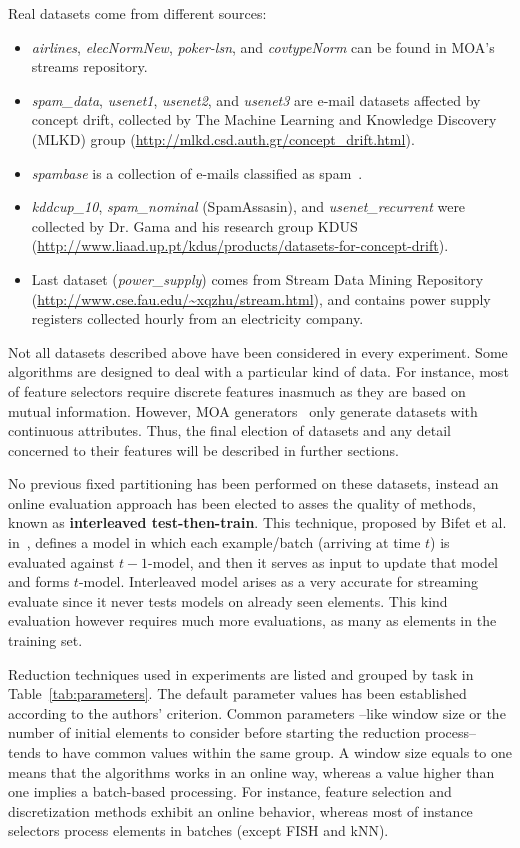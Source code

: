 \documentclass[preprint,12pt]{elsarticle}
\begin{document}
Real datasets come from different sources:

\begin{itemize}
	\item \textit{airlines}, \textit{elecNormNew}, \textit{poker-lsn}, and \textit{covtypeNorm} can be found in MOA's streams repository.
	\item \textit{spam\_data}, \textit{usenet1}, \textit{usenet2}, and \textit{usenet3} are e-mail datasets affected by concept drift, collected by The Machine Learning and Knowledge Discovery (MLKD) group (\url{http://mlkd.csd.auth.gr/concept_drift.html}).
	\item \textit{spambase} is a collection of e-mails classified as spam~\cite{bache13}. 
	\item \textit{kddcup\_10}, \textit{spam\_nominal} (SpamAssasin), and \textit{usenet\_recurrent} were collected by Dr. Gama and his research group KDUS (\url{http://www.liaad.up.pt/kdus/products/datasets-for-concept-drift}). 
	\item Last dataset (\textit{power\_supply}) comes from Stream Data Mining Repository (\url{http://www.cse.fau.edu/~xqzhu/stream.html}), and contains power supply registers collected hourly from an electricity company.
\end{itemize}
 
Not all datasets described above have been considered in every experiment. Some algorithms are designed to deal with a particular kind of data. For instance, most of feature selectors require discrete features inasmuch as they are based on mutual information. However, MOA generators~\cite{bifet10} only generate datasets with continuous attributes. Thus, the final election of datasets and any detail concerned to their features will be described in further sections.

No previous fixed partitioning has been performed on these datasets, instead an online evaluation approach has been elected to asses the quality of methods, known as \textbf{interleaved test-then-train}. This technique, proposed by Bifet et al. in~\cite{bifet09}, defines a model in which each example/batch (arriving at time $t$) is evaluated against $t-1$-model, and then it serves as input to update that model and forms $t$-model. Interleaved model arises as a very accurate for streaming evaluate since it never tests models on already seen elements. This kind evaluation however requires much more evaluations, as many as elements in the training set.

Reduction techniques used in experiments are listed and grouped by task in Table~\ref{tab:parameters}. The default parameter values has been established according to the authors' criterion. Common parameters --like window size or the number of initial elements to consider before starting the reduction process-- tends to have common values within the same group. A window size equals to one means that the algorithms works in an online way, whereas a value higher than one implies a batch-based processing. For instance, feature selection and discretization methods exhibit an online behavior, whereas most of instance selectors process elements in batches (except FISH and kNN).
\end{document}
